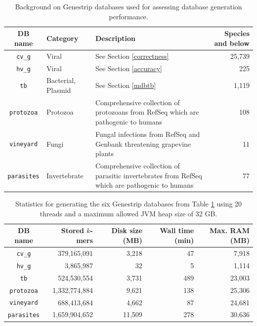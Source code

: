\documentclass[pdflatex,sn-vancouver-num]{sn-jnl}
\begin{document}
    \begin{table}[h]
        \centering
        \begin{tabular}{c|p{1.6cm}|p{6cm}|r}
            DB name & Category & Description & Species and below \\
            \hline
            \texttt{cv\_g} & Viral & See Section \ref{correctness} & 25,739 \\
            \texttt{hv\_g} & Viral & See Section \ref{accuracy} & 225  \\
            \texttt{tb} & Bacterial, Plasmid & See Section \ref{mdbtb} &  1,119\\
            \texttt{protozoa} & Protozoa & Comprehensive collection of protozoans from RefSeq which are pathogenic to humans \citep{mehlhorn2012parasiten} & 108 \\
            \texttt{vineyard} & Fungi & Fungal infections from RefSeq and Genbank threatening grapevine plants \citep{hillebrand1998rebschutz} & 11 \\
            \texttt{parasites} & Invertebrate & Comprehensive collection of parasitic invertebrates from RefSeq which are pathogenic to humans \citep{mehlhorn2012parasiten} & 77 \\
        \end{tabular}

        \caption{Background on Genestrip databases used for assessing database generation performance.}\label{dbdesc}
    \end{table}

    \begin{table}[h]
        \centering
        \begin{tabular}{c|r|r|r|r}
            DB name & Stored $k$-mers & Disk size (MB) & Wall time (min) & Max. RAM (MB) \\
            \hline
            \texttt{cv\_g} & 379,165,091 & 3,218 & 47 & 7,918 \\
            \texttt{hv\_g} &   3,865,987 & 32 & 5 & 1,114 \\
            \texttt{tb} & 524,530,554 & 3,731 & 489 & 23,003 \\
            \texttt{protozoa} & 1,332,774,884 & 9,621 & 138 & 25,306 \\
            \texttt{vineyard} & 688,413,684 & 4,662 & 87 & 24,681 \\
            \texttt{parasites} & 1,659,904,652 & 11,509 & 278 & 30,636 \\
        \end{tabular}
        \caption{Statistics for generating the six Genestrip databases from Table \ref{dbdesc} using 20 threads and a maximum allowed JVM heap size of 32 GB.}\label{dbperf}
    \end{table}
\end{document}
